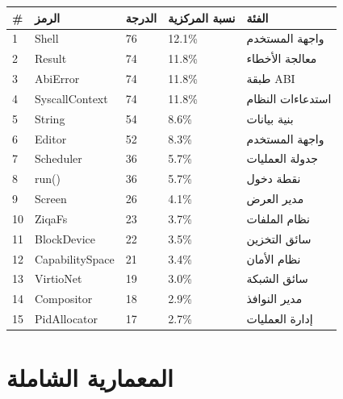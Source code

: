 \documentclass[12pt,a4paper]{article}
\theoremstyle{definition}
\newcommand{\en}[1]{\textenglish{#1}}
\begin{document}
\vspace{0.3cm}
\begin{center}
\begin{tabular}{C{0.5cm}L{4cm}R{2cm}R{3cm}C{3cm}}
\toprule
{}
\color{white}\textbf{\#} &
\color{white}\textbf{الرمز} &
\color{white}\textbf{الدرجة} &
\color{white}\textbf{نسبة المركزية} &
\color{white}\textbf{الفئة} \\
\midrule
{} 1 & \en{Shell} & 76 & \en{12.1\%} & واجهة المستخدم \\
2 & \en{Result} & 74 & \en{11.8\%} & معالجة الأخطاء \\
 3 & \en{AbiError} & 74 & \en{11.8\%} & طبقة \en{ABI} \\
4 & \en{SyscallContext} & 74 & \en{11.8\%} & استدعاءات النظام \\
 5 & \en{String} & 54 & \en{8.6\%} & بنية بيانات \\
6 & \en{Editor} & 52 & \en{8.3\%} & واجهة المستخدم \\
 7 & \en{Scheduler} & 36 & \en{5.7\%} & جدولة العمليات \\
8 & run() & 36 & \en{5.7\%} & نقطة دخول \\
 9 & \en{Screen} & 26 & \en{4.1\%} & مدير العرض \\
10 & \en{ZiqaFs} & 23 & \en{3.7\%} & نظام الملفات \\
 11 & \en{BlockDevice} & 22 & \en{3.5\%} & سائق التخزين \\
12 & \en{CapabilitySpace} & 21 & \en{3.4\%} & نظام الأمان \\
 13 & \en{VirtioNet} & 19 & \en{3.0\%} & سائق الشبكة \\
14 & \en{Compositor} & 18 & \en{2.9\%} & مدير النوافذ \\
 15 & \en{PidAllocator} & 17 & \en{2.7\%} & إدارة العمليات \\
\bottomrule
\end{tabular}
\end{center}

\newpage

\section{المعمارية الشاملة}\label{sec:arch}
\end{document}
